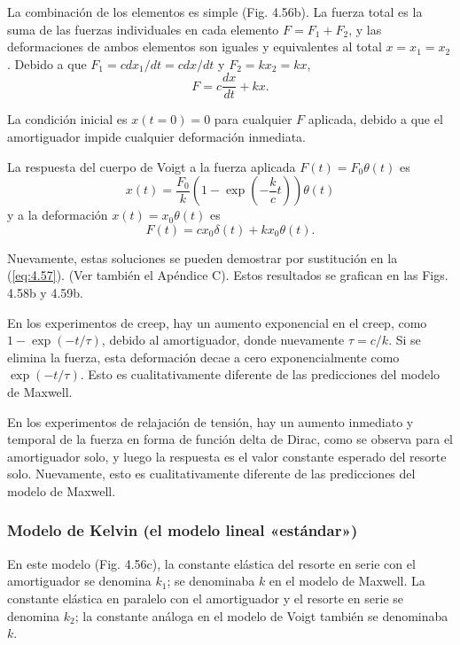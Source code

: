 \documentclass[12pt]{book}
\begin{document}
La combinación de los elementos es simple (Fig. 4.56b). La fuerza total es la suma de las fuerzas individuales en cada elemento $F = F_1 + F_2$, y las deformaciones de ambos elementos son iguales y equivalentes al total $x = x_1 = x_2$. Debido a que $F_1 = c dx_1/dt = c dx/dt$ y $F_2 = kx_2 = kx$,
\begin{equation}
F = c\frac{dx}{dt} + kx.
\label{eq:4.57}
\end{equation}

La condición inicial es $x(t = 0) = 0$ para cualquier $F$ aplicada, debido a que el amortiguador impide cualquier deformación inmediata.

La respuesta del cuerpo de Voigt a la fuerza aplicada $F(t) = F_0\theta(t)$ es
\begin{equation}
x(t) = \frac{F_0}{k} \left( 1 - \exp\left(-\frac{k}{c}t\right) \right) \theta(t)
\label{eq:4.58}
\end{equation}
y a la deformación $x(t) = x_0\theta(t)$ es
\begin{equation}
F(t) = cx_0\delta(t) + kx_0\theta(t).
\label{eq:4.59}
\end{equation}

Nuevamente, estas soluciones se pueden demostrar por sustitución en la (\ref{eq:4.57}). (Ver también el Apéndice C). Estos resultados se grafican en las Figs. 4.58b y 4.59b.

En los experimentos de creep, hay un aumento exponencial en el creep, como $1 - \exp(-t/\tau)$, debido al amortiguador, donde nuevamente $\tau = c/k$. Si se elimina la fuerza, esta deformación decae a cero exponencialmente como $\exp(-t/\tau)$. Esto es cualitativamente diferente de las predicciones del modelo de Maxwell.

En los experimentos de relajación de tensión, hay un aumento inmediato y temporal de la fuerza en forma de función delta de Dirac, como se observa para el amortiguador solo, y luego la respuesta es el valor constante esperado del resorte solo. Nuevamente, esto es cualitativamente diferente de las predicciones del modelo de Maxwell.

\subsubsection*{Modelo de Kelvin (el modelo lineal «estándar»)}

En este modelo (Fig. 4.56c), la constante elástica del resorte en serie con el amortiguador se denomina $k_1$; se denominaba $k$ en el modelo de Maxwell. La constante elástica en paralelo con el amortiguador y el resorte en serie se denomina $k_2$; la constante análoga en el modelo de Voigt también se denominaba $k$.
\end{document}
